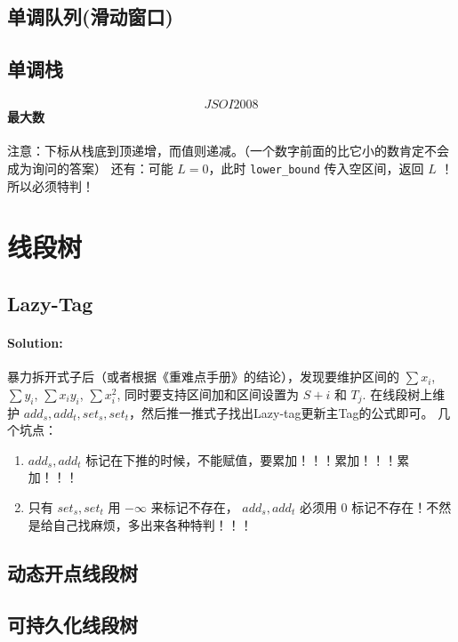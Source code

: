 \documentclass{article}
\begin{document}
		\subsection{单调队列(滑动窗口)}
		
		\subsection{单调栈}
		\paragraph{\[JSOI2008\] 最大数}
		注意：下标从栈底到顶递增，而值则递减。（一个数字前面的比它小的数肯定不会成为询问的答案）
		还有：可能 $L = 0$，此时 \lstinline|lower_bound| 传入空区间，返回 $L$ ！ 所以必须特判！
		

	\newpage

	\section{线段树}
		\subsection{Lazy-Tag} %
			\paragraph{Solution:}
			暴力拆开式子后（或者根据《重难点手册》的结论），发现要维护区间的 $\sum x_i$, $\sum y_i$, $\sum x_i y_i$, $\sum x_i^2$, 同时要支持区间加和区间设置为 $S+i \text{ 和 } T_j$.
			在线段树上维护 $add_s, add_t, set_s, set_t$，然后推一推式子找出Lazy-tag更新主Tag的公式即可。
			几个坑点：
			\begin{enumerate}
				\item $add_s, add_t$ 标记在下推的时候，不能赋值，要累加！！！累加！！！累加！！！
				\item 只有 $set_s, set_t$ 用 $-\infty$ 来标记不存在， $add_s, add_t$ 必须用 $0$ 标记不存在！不然是给自己找麻烦，多出来各种特判！！！
			\end{enumerate}
			
		\subsection{动态开点线段树}
		
		\subsection{可持久化线段树}
\end{document}
